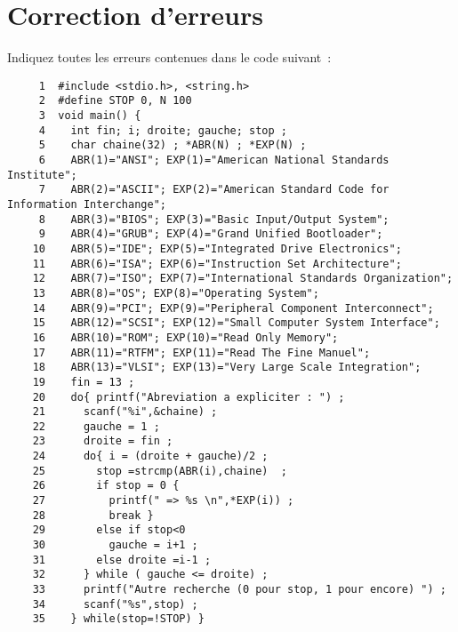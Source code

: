 \section{Correction d'erreurs}
\label{sec:CorrectionDErreurs}
Indiquez toutes les erreurs contenues dans le code suivant~:
\begin{verbatim}
     1  #include <stdio.h>, <string.h>
     2  #define STOP 0, N 100
     3  void main() {
     4    int fin; i; droite; gauche; stop ;
     5    char chaine(32) ; *ABR(N) ; *EXP(N) ;
     6    ABR(1)="ANSI"; EXP(1)="American National Standards Institute";
     7    ABR(2)="ASCII"; EXP(2)="American Standard Code for Information Interchange";
     8    ABR(3)="BIOS"; EXP(3)="Basic Input/Output System";
     9    ABR(4)="GRUB"; EXP(4)="Grand Unified Bootloader";
    10    ABR(5)="IDE"; EXP(5)="Integrated Drive Electronics";
    11    ABR(6)="ISA"; EXP(6)="Instruction Set Architecture";
    12    ABR(7)="ISO"; EXP(7)="International Standards Organization";
    13    ABR(8)="OS"; EXP(8)="Operating System";
    14    ABR(9)="PCI"; EXP(9)="Peripheral Component Interconnect";
    15    ABR(12)="SCSI"; EXP(12)="Small Computer System Interface";
    16    ABR(10)="ROM"; EXP(10)="Read Only Memory";
    17    ABR(11)="RTFM"; EXP(11)="Read The Fine Manuel";
    18    ABR(13)="VLSI"; EXP(13)="Very Large Scale Integration";
    19    fin = 13 ;
    20    do{ printf("Abreviation a expliciter : ") ;
    21      scanf("%i",&chaine) ;
    22      gauche = 1 ;
    23      droite = fin ;
    24      do{ i = (droite + gauche)/2 ;
    25        stop =strcmp(ABR(i),chaine)  ;
    26        if stop = 0 {
    27          printf(" => %s \n",*EXP(i)) ;
    28          break }
    29        else if stop<0
    30          gauche = i+1 ;
    31        else droite =i-1 ;
    32      } while ( gauche <= droite) ;
    33      printf("Autre recherche (0 pour stop, 1 pour encore) ") ;
    34      scanf("%s",stop) ;
    35    } while(stop=!STOP) }
\end{verbatim}
